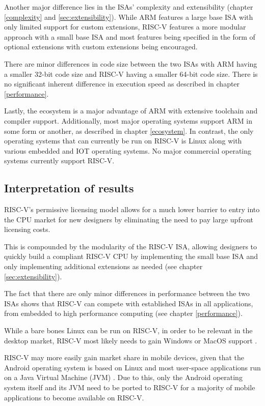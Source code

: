 \documentclass[conference]{IEEEtran}
\begin{document}
	Another major difference lies in the \glspl{ISA}' complexity and extensibility (chapter \ref{complexity} and \ref{sec:extensibility}).
	While ARM features a large base \gls{ISA} with only limited support for custom extensions, RISC-V features a more modular
	approach with a small base \gls{ISA} and most features being specified in the form of optional extensions with custom extensions being
	encouraged.

	There are minor differences in code size between the two \glspl{ISA} with ARM having a smaller 32-bit code size and RISC-V having a
	smaller 64-bit code size. There is no significant inherent difference in execution speed as described in chapter \ref{performance}.

	Lastly, the ecosystem is a major advantage of ARM with extensive toolchain and compiler support. Additionally, most major operating systems
	support ARM in some form or another, as described in chapter \ref{ecosystem}.
	In contrast, the only operating systems that can currently be run on RISC-V is Linux along with various embedded and IOT operating systems.
	No major commercial operating systems currently support RISC-V.

	\subsection{Interpretation of results}
	RISC-V's permissive licensing model allows for a much lower barrier to entry into the \gls{CPU} market for new designers
	by eliminating the need to pay large upfront licensing costs.
	
	This is compounded by the modularity of the RISC-V \gls{ISA}, allowing designers to quickly build a compliant RISC-V \gls{CPU}
	by implementing the small base \gls{ISA} and only implementing additional extensions as needed (see chapter \ref{sec:extensibility}).

	The fact that there are only minor differences in performance between the two \glspl{ISA} shows that RISC-V can
	compete with established \glspl{ISA} in all applications, from embedded to high performance computing (see chapter \ref{performance}).

	While a bare bones Linux can be run on RISC-V, in order
	to be relevant in the desktop market, RISC-V most likely needs to gain Windows or MacOS support \cite{StatCounter2020}.
	
	RISC-V may more easily gain market share in mobile devices, given that the Android operating
	system is based on Linux and most user-space applications
	run on a Java Virtual Machine (JVM) \cite{Ehringer2010}. Due to this, only
	the Android operating system itself and its JVM need to be
	ported to RISC-V for a majority of mobile applications to
	become available on RISC-V.
\end{document}
